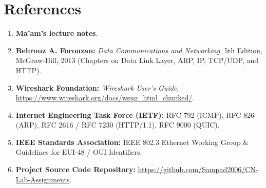 \documentclass[11pt,a4paper]{article}
\begin{document}
\section{References}
\begin{enumerate}[leftmargin=*]
    \item \textbf{Ma'am's lecture notes}.
    \item \textbf{Behrouz A. Forouzan:} \textit{Data Communications and Networking}, 5th Edition, McGraw-Hill, 2013 (Chapters on Data Link Layer, ARP, IP, TCP/UDP, and HTTP).
    \item \textbf{Wireshark Foundation:} \textit{Wireshark User's Guide}, \url{https://www.wireshark.org/docs/wsug_html_chunked/}.
    \item \textbf{Internet Engineering Task Force (IETF):} RFC 792 (ICMP), RFC 826 (ARP), RFC 2616 / RFC 7230 (HTTP/1.1), RFC 9000 (QUIC).
    \item \textbf{IEEE Standards Association:} IEEE 802.3 Ethernet Working Group \& Guidelines for EUI-48 / OUI Identifiers.
    \item \textbf{Project Source Code Repository:} \url{https://github.com/Sampad2006/CN-Lab-Assignments}.
\end{enumerate}
\end{document}
